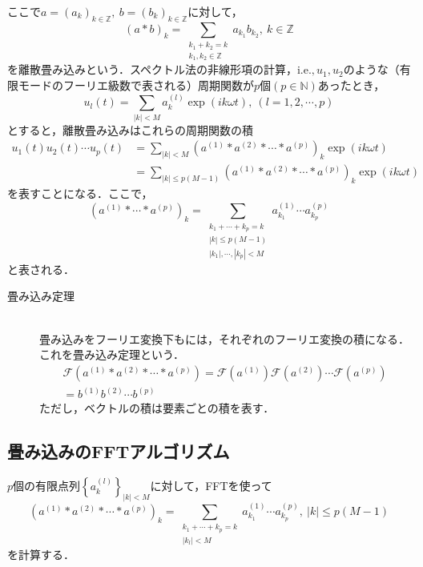 \documentclass[11pt,a4paper,titlepage]{jsreport}
\theoremstyle{definition}
\begin{document}
ここで$a=(a_k)_{k\in\mathbb{Z}},\ b=(b_k)_{k\in\mathbb{Z}}$に対して，
\begin{equation*}
  (a * b)_k = \sum_{\substack{{k_1+k_2=k} \\ {k_1,k_2\in\mathbb{Z}}}} a_{k_1}b_{k_2},\ k\in\mathbb{Z}
\end{equation*}
を離散畳み込みという．スペクトル法の非線形項の計算，$\mathrm{i.e.},u_1,u_2$のような（有限モードのフーリエ級数で表される）周期関数が$p個(p\in\mathbb{N})$あったとき，
\begin{equation*}
  u_l(t) = \sum_{|k|<M} a_k^{(l)} \exp(ik\omega t),\ (l=1,2,\cdots,p)
\end{equation*}
とすると，離散畳み込みはこれらの周期関数の積
\begin{align*}
  u_1(t)u_2(t)\cdots u_p(t) & = \sum_{|k|<M} \left(a^{(1)} * a^{(2)} * \cdots * a^{(p)}\right)_k \exp(ik\omega t)          \\
                            & = \sum_{|k|\leq p(M-1)} \left(a^{(1)} * a^{(2)} * \cdots * a^{(p)}\right)_k \exp(ik\omega t)
\end{align*}
を表すことになる．ここで，
\begin{equation*}
  \left( a^{(1)} * \cdots * a^{(p)} \right)_k = \sum_{\substack{{k_1+\cdots+k_p=k} \\ {|k| \leq p(M-1)} \\ {|k_1|,\cdots,|k_p|<M}}} a_{k_1}^{(1)}\cdots a_{k_p}^{(p)}
\end{equation*}
と表される．

\begin{description}
  \item[畳み込み定理]
    \quad \\
    畳み込みをフーリエ変換下もには，それぞれのフーリエ変換の積になる．これを畳み込み定理という．
    \begin{align*}
      \mathcal{F} \left( a^{(1)} * a^{(2)} * \cdots * a^{(p)} \right)= \mathcal{F} \left( a^{(1)} \right) \mathcal{F} \left( a^{(2)} \right) \cdots \mathcal{F} \left( a^{(p)} \right) \\
      = b^{(1)}b^{(2)}\cdots b^{(p)}
    \end{align*}
    ただし，ベクトルの積は要素ごとの積を表す．
\end{description}


\subsection{畳み込みのFFTアルゴリズム}
$p$個の有限点列$\left\{a_{k}^{(l)}\right\}_{|k|<M}$に対して，FFTを使って
\begin{equation*}
  \left(a^{(1)} * a^{(2)} * \cdots * a^{(p)}\right)_k = \sum_{\substack{{k_1+\cdots+k_p=k} \\ {|k_l|<M}}} a_{k_1}^{(1)}\cdots a_{k_p}^{(p)},\ |k| \leq p(M-1)
\end{equation*}
を計算する．
\end{document}
